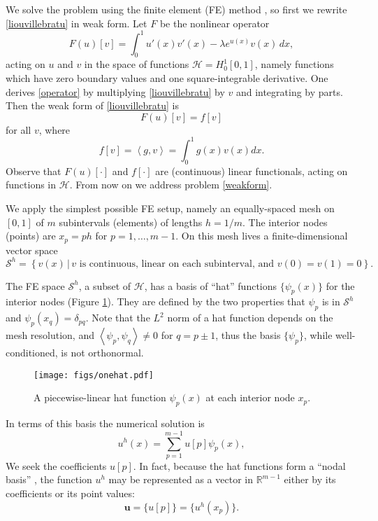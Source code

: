 \documentclass[letterpaper,final,12pt,reqno]{amsart}
\newcommand{\RR}{\mathbb{R}}
\newcommand{\bu}{\mathbf{u}}
\newcommand{\ip}[2]{\left<#1,#2\right>}
\begin{document}
We solve the problem using the finite element (FE) method \cite{Bueler2021,Elmanetal2014}, so first we rewrite \eqref{liouvillebratu} in weak form.  Let $F$ be the nonlinear operator
\begin{equation}
  F(u)[v] = \int_0^1 u'(x) v'(x) - \lambda e^{u(x)} v(x)\, dx,  \label{operator}
\end{equation}
acting on $u$ and $v$ in the space of functions $\mathcal{H}=H_0^1[0,1]$, namely functions which have zero boundary values and one square-integrable derivative.  One derives \eqref{operator} by multiplying \eqref{liouvillebratu} by $v$ and integrating by parts.  Then the weak form of \eqref{liouvillebratu} is
\begin{equation}
  F(u)[v] = f[v] \label{weakform}
\end{equation}
for all $v$, where
\begin{equation}
  f[v] = \ip{g}{v} = \int_0^1 g(x) v(x) dx.  \label{rhsfunctional}
\end{equation}
Observe that $F(u)[\cdot]$ and $f[\cdot]$ are (continuous) linear functionals, acting on functions in $\mathcal{H}$.  From now on we address problem \eqref{weakform}.

We apply the simplest possible FE setup, namely an equally-spaced mesh on $[0,1]$ of $m$ subintervals (elements) of lengths $h=1/m$.  The interior nodes (points) are $x_p=ph$ for $p=1,\dots,m-1$.  On this mesh lives a finite-dimensional vector space
\begin{equation}
\mathcal{S}^h = \left\{v(x)\,\big|\,v \text{ is continuous, linear on each subinterval, and } v(0)=v(1)=0\right\}.  \label{fespace}
\end{equation}

The FE space $\mathcal{S}^h$, a subset of $\mathcal{H}$, has a basis of ``hat'' functions $\{\psi_p(x)\}$ for the interior nodes (Figure \ref{fig:onehat}).  They are defined by the two properties that $\psi_p$ is in $\mathcal{S}^h$ and $\psi_p(x_q)=\delta_{pq}$.  Note that the $L^2$ norm of a hat function depends on the mesh resolution, and $\ip{\psi_p}{\psi_q}\ne 0$ for $q=p\pm1$, thus the basis $\{\psi_p\}$, while well-conditioned, is not orthonormal.

\begin{figure}
\texttt{[image: figs/onehat.pdf]}
\caption{A piecewise-linear hat function $\psi_p(x)$ at each interior node $x_p$.}
\label{fig:onehat}
\end{figure}

In terms of this basis the numerical solution is
\begin{equation}
  u^h(x) = \sum_{p=1}^{m-1} u[p] \psi_p(x),  \label{fesolution}
\end{equation}
We seek the coefficients $u[p]$.  In fact, because the hat functions form a ``nodal basis'' \cite{Elmanetal2014}, the function $u^h$ may be represented as a vector in $\RR^{m-1}$ either by its coefficients or its point values:
\begin{equation}
\bu =\{u[p]\} = \{u^h(x_p)\}.  \label{fevector}
\end{equation}
\end{document}
